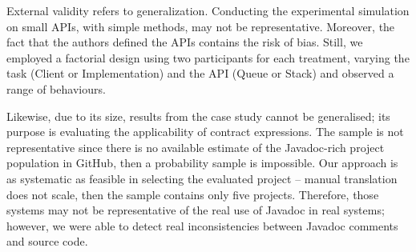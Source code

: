 External validity refers to generalization. 
Conducting the experimental simulation on small APIs, with simple methods, may not be representative. Moreover, the fact that the authors defined the APIs contains the risk of bias. Still, we employed a factorial design using two participants for each treatment, varying the task (Client or Implementation) and the API (Queue or Stack) and observed a range of behaviours. 

Likewise, due to its size, results from the case study cannot be generalised; its purpose is evaluating the applicability of contract expressions.
The sample is not representative since there is no available estimate of the Javadoc-rich project
population in GitHub, then a probability sample is impossible. 
Our approach is as systematic as feasible in selecting the evaluated project -- manual translation
does not scale, then the sample contains only five projects.
Therefore, those systems may not be representative of the real use of Javadoc in real systems; however, we were able to detect real inconsistencies between Javadoc comments and source code.



